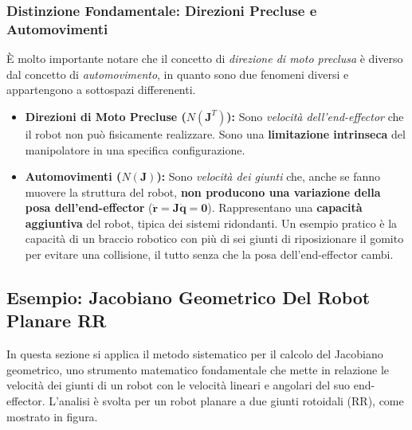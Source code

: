﻿\documentclass[11pt, a4paper]{article}
\begin{document}
\subsubsection{Distinzione Fondamentale: Direzioni Precluse e Automovimenti}
È molto importante notare che il concetto di \textit{direzione di moto preclusa} è diverso dal concetto di \textit{automovimento}, in quanto sono due fenomeni diversi e appartengono a sottospazi differenenti.

\begin{itemize}
    \item \textbf{Direzioni di Moto Precluse ($N(\bm{J}^T)$):} Sono \textit{velocità dell'end-effector} che il robot non può fisicamente realizzare. Sono una \textbf{limitazione intrinseca} del manipolatore in una specifica configurazione.

    \item \textbf{Automovimenti ($N(\bm{J})$):} Sono \textit{velocità dei giunti} che, anche se fanno muovere la struttura del robot, \textbf{non producono una variazione della posa dell'end-effector} ($\dot{\bm{r}} = \bm{J}\dot{\bm{q}} = \bm{0}$). Rappresentano una \textbf{capacità aggiuntiva} del robot, tipica dei sistemi ridondanti. Un esempio pratico è la capacità di un braccio robotico con più di sei giunti di riposizionare il gomito per evitare una collisione, il tutto senza che la posa dell'end-effector cambi.
\end{itemize}


\newpage
\subsection{Esempio: Jacobiano Geometrico Del Robot Planare RR}
In questa sezione si applica il metodo sistematico per il calcolo del Jacobiano geometrico, uno strumento matematico fondamentale che mette in relazione le velocità dei giunti di un robot con le velocità lineari e angolari del suo end-effector. L'analisi è svolta per un robot planare a due giunti rotoidali (RR), come mostrato in figura.
\end{document}
